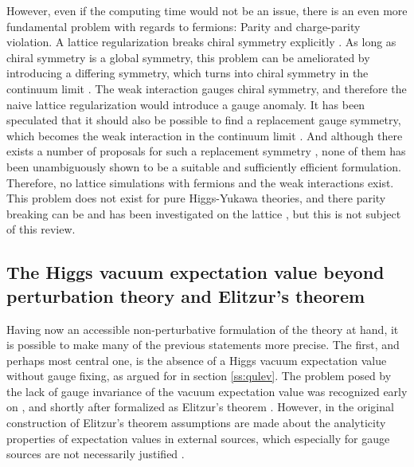 \documentclass[final,12pt,3p,longtitle]{elsarticle}
\newcommand*{\1}{1\!\!\!\bot}
\begin{document}
However, even if the computing time would not be an issue, there is an even more fundamental problem with regards to fermions: Parity and charge-parity violation. A lattice regularization breaks chiral symmetry explicitly \cite{Montvay:1994cy,Gattringer:2010zz,DeGrand:2006zz}. As long as chiral symmetry is a global symmetry, this problem can be ameliorated by introducing a differing symmetry, which turns into chiral symmetry in the continuum limit \cite{Gattringer:2010zz,DeGrand:2006zz}. The weak interaction gauges chiral symmetry, and therefore the naive lattice regularization would introduce a gauge anomaly. It has been speculated that it should also be possible to find a replacement gauge symmetry, which becomes the weak interaction in the continuum limit \cite{Hasenfratz:2007dp}. And although there exists a number of proposals for such a replacement symmetry \cite{Grabowska:2015qpk,Gattringer:2008je,Cundy:2010pu,Igarashi:2009kj}, none of them has been unambiguously shown to be a suitable and sufficiently efficient formulation. Therefore, no lattice simulations with fermions and the weak interactions exist. This problem does not exist for pure Higgs-Yukawa theories, and there parity breaking can be and has been investigated on the lattice \cite{Fodor:2007fn,Gerhold:2007gx,Gerhold:2010bh,Gerhold:2011mx,Chu:2015nha,Bulava:2012rb}, but this is not subject of this review.

\subsection{The Higgs vacuum expectation value beyond perturbation theory and Elitzur's theorem}\label{ss:vev}

Having now an accessible non-perturbative formulation of the theory at hand, it is possible to make many of the previous statements more precise. The first, and perhaps most central one, is the absence of a Higgs vacuum expectation value without gauge fixing, as argued for in section \ref{ss:qulev}. The problem posed by the lack of gauge invariance of the vacuum expectation value was recognized early on \cite{Fischler:1974ue}, and shortly after formalized as Elitzur's theorem \cite{Elitzur:1975im}. However, in the original construction of Elitzur's theorem assumptions are made about the analyticity properties of expectation values in external sources, which especially for gauge sources are not necessarily justified \cite{Maas:2013sca}.
\end{document}
